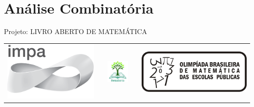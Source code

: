 \chapter{Análise Combinatória}
\label{combinatoria-chap}

\mbox{}\thispagestyle{empty}\clearpage

\thispagestyle{empty}

\begin{center}
Projeto: LIVRO ABERTO DE MATEMÁTICA

\noindent \begin{tabular}{lcccr}
\includegraphics[scale=.15]{impa}& \quad\quad& \includegraphics[width=3cm]{logo} & \quad\quad& \includegraphics[scale=.24]{obmep} 
\end{tabular}
\end{center}

\vspace*{.3cm}


